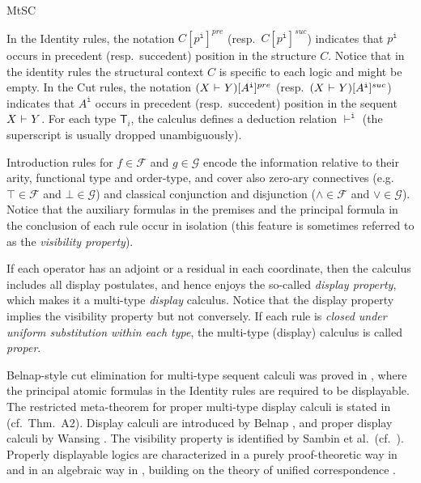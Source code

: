 \begin{entry}{MtSC}
\begin{clarifications}
In the Identity rules, the notation $C[p^{\texttt{i}}]^{pre}$ (resp.~$C[p^{\texttt{i}}]^{suc}$) indicates that $p^{\texttt{i}}$ occurs in precedent (resp.~succedent) position in the structure $C$. Notice that in the identity rules the structural context $C$ is specific to each logic and might be empty. In the Cut rules, the notation $(X {\mbox{$\ \vdash\ $}} Y)[A^{\texttt{i}}]^{pre}$ (resp.~$(X {\mbox{$\ \vdash\ $}} Y)[A^{\texttt{i}}]^{suc}$) indicates that $A^{\texttt{i}}$ occurs in precedent (resp.~succedent) position in the sequent $X {\mbox{$\ \vdash\ $}} Y$.  For  each type $\mathsf{T}_i$, the calculus defines a deduction relation $\vdash^{\texttt{i}}$ (the superscript is usually dropped unambiguously). 

Introduction rules for $f\in\mathcal{F}$ and $g\in\mathcal{G}$ encode the information relative to their arity, functional type and order-type, and cover also zero-ary connectives (e.g.~$\top\in \mathcal{F}$ and $\bot\in \mathcal{G}$) and classical conjunction and disjunction ($\wedge\in \mathcal{F}$ and $\vee\in \mathcal{G}$). Notice that the auxiliary formulas in the premises and the principal formula in the conclusion of each rule occur in isolation (this feature is sometimes referred to as the {\em visibility property}). 

If each operator has an adjoint or a residual in each coordinate, then the calculus includes all display postulates, and hence enjoys the so-called {\em display property}, which makes it a multi-type {\em display} calculus. Notice that the display property implies the visibility property but not conversely. If each rule is {\em closed under uniform substitution within each type}, the multi-type (display) calculus is called {\em proper}. \end{clarifications}


\begin{history}
Belnap-style cut elimination for multi-type sequent calculi was proved in \cite{FrittellaGrecoKurzPalmigianoSikimic2014}, where the principal atomic formulas in the Identity rules are required to be displayable. The restricted meta-theorem for proper multi-type display calculi is stated in \cite[Sec.~A]{GrecoPalmigiano} (cf.~Thm.~A2). Display calculi are introduced by Belnap \cite{Belnap1982}, and proper display calculi by Wansing \cite{Wansing1998}. The visibility property is identified by Sambin et al.~(cf.~\cite{SambinBattilottiFaggian2014}). Properly displayable logics are characterized in a purely proof-theoretic way in \cite{CiabattoniRamanayake2016} and in an algebraic way in \cite{GrecoMaPalmigianoTzimoulisZhao2016}, building on the theory of unified correspondence \cite{ConradieGhilardiPalmigiano2014}.


\end{history}
\end{entry}

